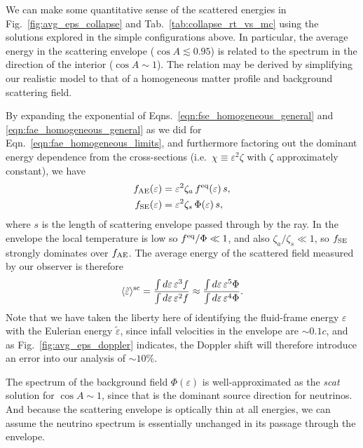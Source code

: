 \documentclass[aps,floatfix,prd,superscriptaddress,twocolumn]{revtex4-1}
\begin{document}
We can make some quantitative sense of the scattered energies in
Fig.~\ref{fig:avg_eps_collapse} and Tab.~\ref{tab:collapse_rt_vs_mc}
using the solutions explored in the simple configurations above.
In particular, the average energy in the scattering envelope
($\cos A\lesssim 0.95$) is related to the spectrum in the direction
of the interior ($\cos A \sim 1$).
The relation may be derived by simplifying our realistic model
to that of a homogeneous matter profile and background scattering field.

By expanding the exponential of
Eqns.~\ref{eqn:fse_homogeneous_general} and \ref{eqn:fae_homogeneous_general}
as we did for Eqn.~\ref{eqn:fae_homogeneous_limits},
and furthermore factoring out the dominant energy dependence from the
cross-sections (i.e.\ $\chi\equiv\varepsilon^2 \zeta$
with $\zeta$ approximately constant), we have
\begin{align}
  \label{eqn:fae_homogeneous_thin_limit}
  f_{\rm AE}(\varepsilon)
  &= \varepsilon^2 \zeta_a \,f^{\rm eq}(\varepsilon)\,s, \\
  \label{eqn:fse_homogeneous_thin_limit}
  f_{\rm SE}(\varepsilon)
  &= \varepsilon^2 \zeta_s \,\Phi(\varepsilon)\,s,
\end{align}
where $s$ is the length of scattering envelope passed through by the ray.
In the envelope the local temperature is low so $f^{\rm eq}/\Phi\ll 1$,
and also $\zeta_a/\zeta_s\ll 1$,
so $f_{\rm SE}$ strongly dominates over $f_{\rm AE}$.
The average energy of the scattered field measured by our observer
is therefore
\begin{equation}
  \label{eqn:avg_eps_sc}
  \langle \tilde{\varepsilon} \rangle^{\rm sc}
  = \frac{\int d\varepsilon\,\varepsilon^3 f}{\int d\varepsilon\,\varepsilon^2 f}
  \approx \frac{\int d\varepsilon\,\varepsilon^5 \Phi}{\int d\varepsilon\,\varepsilon^4 \Phi}.
\end{equation}
Note that we have taken the liberty here of identifying the fluid-frame energy
$\varepsilon$ with the Eulerian energy $\tilde{\varepsilon}$,
since infall velocities in the envelope are $\sim0.1c$,
and as Fig.~\ref{fig:avg_eps_doppler} indicates,
the Doppler shift will therefore introduce an error into our analysis of
$\sim10\%$.

The spectrum of the background field $\Phi(\varepsilon)$ is well-approximated
as the \emph{scat} solution for $\cos A\sim 1$, since that is the dominant
source direction for neutrinos.
And because the scattering envelope is optically thin at all energies,
we can assume the neutrino spectrum is essentially unchanged in its passage
through the envelope.
\end{document}

